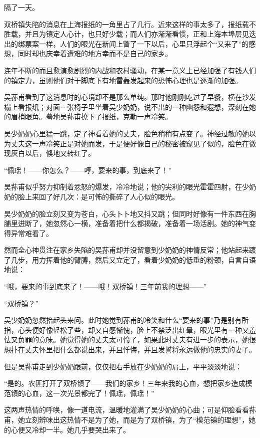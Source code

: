 \par 隔了一天。
\par 双桥镇失陷的消息在上海报纸的一角里占了几行。近来这样的事太多了，报纸载不胜载，并且为镇定人心计，也只好少载；而人们亦渐渐看惯，正和上海本埠层见迭出的绑票案一样，人们的眼光在新闻上瞥了一下以后，心里只浮起个“又来了”的感想，同时却也庆幸着遭难的地方幸而不是自己的家乡。
\par 连年不断的而且愈演愈剧烈的内战和农村骚动，在某一意义上已经加强了有钱人们的镇定力，虽则他们对于脚底下有地雷轰发起来的恐怖心理也是逐渐的加强。
\par 吴荪甫看到了这消息时的心境却不是那么单纯。那时他刚刚吃过了早餐，横在沙发榻上看报纸；对面一张椅子里坐着吴少奶奶，说不出的一种幽怨和遐想，深刻在她的眉梢眼角。蓦地吴荪甫撩下了报纸，克勒一声冷笑。
\par 吴少奶奶心里猛一跳，定了神看着她的丈夫，脸色稍稍有点变了。神经过敏的她以为丈夫这一声冷笑正是对她而发，于是便好像自己的秘密被窥见了似的，脸色在微现灰白以后，倏地又转红了。
\par “佩瑶！——你怎么？——哼，要来的事，到底来了！”
\par 吴荪甫似乎努力抑制着忿怒的爆发，冷冷地说；他的尖利的眼光霍霍四射，在少奶奶的脸上来回了好几次：是可怖的撕碎了人心似的眼光。
\par 吴少奶奶的脸立刻又变为苍白，心头卜卜地又抖又跳；但同时好像有一件东西在胸脯里迸断了，她忽然心一横，准备着把什么都揭破，准备着一场活剧。她的神气变得异常难看了。
\par 然而全心神贯注在家乡失陷的吴荪甫却并没留意到少奶奶的神情反常；他站起来踱了几步，用力挥着他的臂膊，然后又立定了，看着少奶奶的低垂的粉颈，自言自语地说：
\par “哦，要来的事到底来了！——哦！双桥镇！三年前我的理想——”
\par “双桥镇？”
\par 吴少奶奶忽然抬起头来问。此时她觉到荪甫的冷笑和什么“要来的事”乃是别有所指，心头便好像轻松了些，却又自感惭愧，脸上不禁泛出红晕，眼光里有一种又羞怯又负罪的意味。她觉得她的丈夫太可怜了，如果此时丈夫有进一步的表示，她很想扑在丈夫怀里把什么都说出来，并且忏悔，并且发誓将永远做他的忠实的妻子。
\par 但是吴荪甫走到少奶奶跟前，仅仅把右手放在少奶奶的肩上，平平淡淡地说：
\par “是的。农匪打开了双桥镇了——我们的家乡！三年来我的心血，想把家乡造成模范镇的心血，这一次光景都完了！佩瑶，佩瑶！”
\par 这两声热情的呼唤，像一道电流，温暖地灌满了吴少奶奶的心曲；可是仰脸看看荪甫，她立刻辨味出这热情不是为了她，而是为了双桥镇，为了“模范镇的理想”，她的心便又冷却一半。她几乎要哭出来了。

